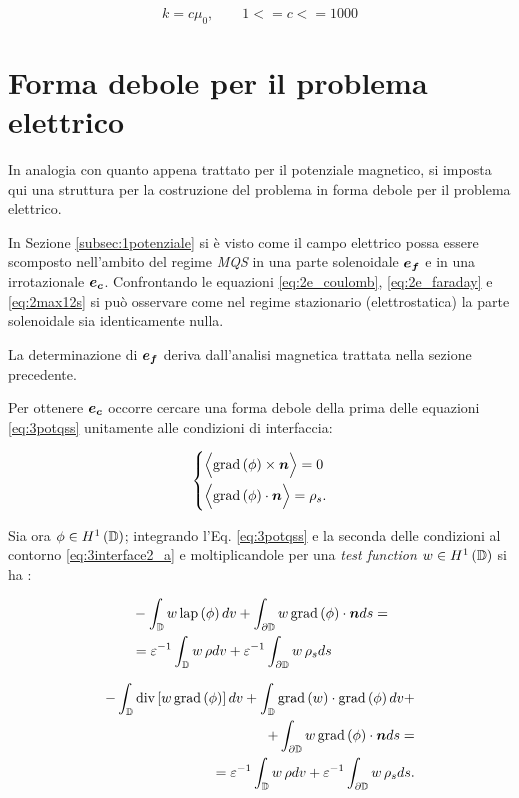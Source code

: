 \begin{equation}
\label{eq:3 regpar}
k = c \mu_0 , \qquad 1<= c <=1000
\end{equation}
\section{Forma debole per il problema elettrico}

In analogia con quanto appena trattato per il potenziale magnetico, si imposta qui una struttura per la costruzione del problema in forma debole per il problema elettrico.

 In Sezione \ref{subsec:1potenziale} si è visto come il campo elettrico possa essere scomposto nell'ambito del regime \textit{MQS} in una parte solenoidale $\boldsymbol{e_f}$ e in una irrotazionale $\boldsymbol{e_c}$. Confrontando le equazioni \eqref{eq:2e_coulomb}, \eqref{eq:2e_faraday} e \eqref{eq:2max12s} si può osservare come nel regime stazionario (elettrostatica) la parte solenoidale sia identicamente nulla. 

La determinazione di $\boldsymbol{e_f}$ deriva dall'analisi magnetica trattata nella sezione precedente. 

Per ottenere $\boldsymbol{e_c}$ occorre cercare una forma debole della prima delle equazioni \eqref{eq:3potqss}
unitamente alle condizioni di interfaccia:

\begin{equation}
\left\{
\begin{aligned}
&\Bigl\langle \text{grad}\left(\phi\right)\times \boldsymbol{n}\Bigr\rangle = 0 \\
&\Bigl\langle \text{grad}\left(\phi\right)\cdot \boldsymbol{n}\Bigr\rangle = \rho_s.
\end{aligned}
\right.
\label{eq:3interface2_a}
\end{equation}

Sia ora $\phi \in H^1\left(\mathbb{D}\right)$; integrando l'Eq. \eqref{eq:3potqss} e la seconda delle condizioni al contorno \eqref{eq:3interface2_a} e moltiplicandole per una \textit{test function} $w \in H^1\left(\mathbb{D}\right)$ si ha :

\begin{align}
\label{eq:3weak_e1}
&-\int_{\mathbb{D}}w \, \text{lap}\left(\phi\right) dv+\int_{\partial\mathbb{D}}w \, \text{grad}\left(\phi\right)\cdot \boldsymbol{n}ds= \nonumber\\
&=\varepsilon^{-1}\int_{\mathbb{D}}w\,\rho dv+\varepsilon^{-1}\int_{\partial\mathbb{D}}w\, \rho_s ds
\end{align}

\begin{eqnarray}
\label{eq:3weak_e2}
-\int_{\mathbb{D}}\text{div}\left[w \, \text{grad}\left(\phi\right)\right]dv+ \int_{\mathbb{D}}\text{grad}\left(w\right)\cdot \text{grad}\left(\phi\right)dv+\\ +\int_{\partial\mathbb{D}}w \, \text{grad}\left(\phi\right)\cdot \boldsymbol{n}ds= \nonumber\\
=\varepsilon^{-1}\int_{\mathbb{D}}w\,\rho dv+\varepsilon^{-1}\int_{\partial\mathbb{D}}w\, \rho_s ds.
\end{eqnarray}

